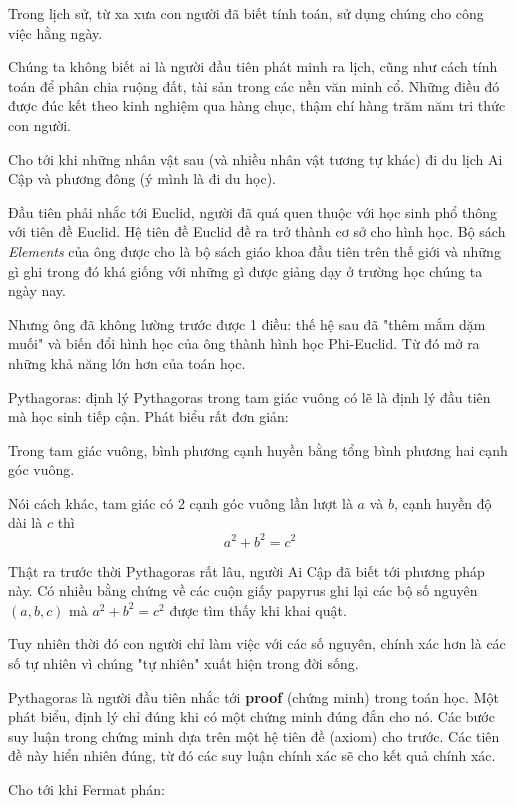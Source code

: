 Trong lịch sử, từ xa xưa con người đã biết tính toán, sử dụng chúng cho công việc hằng ngày.

Chúng ta không biết ai là người đầu tiên phát minh ra lịch, cũng như cách tính toán để phân chia ruộng đất, tài sản trong các nền văn minh cổ.
Những điều đó được đúc kết theo kinh nghiệm qua hàng chục, thậm chí hàng trăm năm tri thức con người.

Cho tới khi những nhân vật sau (và nhiều nhân vật tương tự khác) đi du lịch Ai Cập và phương đông (ý mình là đi du học).

Đầu tiên phải nhắc tới Euclid, người đã quá quen thuộc với học sinh phổ thông với tiên đề Euclid. Hệ tiên đề Euclid đề ra trở thành cơ sở cho hình học. Bộ sách \textit{Elements} của ông được cho là bộ sách giáo khoa đầu tiên trên thế giới và những gì ghi trong đó khá giống với những gì được giảng dạy ở trường học chúng ta ngày nay.

Nhưng ông đã không lường trước được 1 điều: thế hệ sau đã "thêm mắm dặm muối" và biến đổi hình học của ông thành hình học Phi-Euclid. Từ đó mở ra những khả năng lớn hơn của toán học.

Pythagoras: định lý Pythagoras trong tam giác vuông có lẽ là định lý đầu tiên mà học sinh tiếp cận. Phát biểu rất đơn giản:

\begin{theorem}
    Trong tam giác vuông, bình phương cạnh huyền bằng tổng bình phương hai cạnh góc vuông.

    Nói cách khác, tam giác có 2 cạnh góc vuông lần lượt là $a$ và $b$, cạnh huyền độ dài là $c$ thì
    \[a^2 + b^2 = c^2\]
\end{theorem}

Thật ra trước thời Pythagoras rất lâu, người Ai Cập đã biết tới phương pháp này. Có nhiều bằng chứng về các cuộn giấy papyrus ghi lại các bộ số nguyên $(a, b, c)$ mà $a^2 + b^2 = c^2$ được tìm thấy khi khai quật.

Tuy nhiên thời đó con người chỉ làm việc với các số nguyên, chính xác hơn là các số tự nhiên vì chúng "tự nhiên" xuất hiện trong đời sống.

Pythagoras là người đầu tiên nhắc tới \textbf{proof} (chứng minh) trong toán học. Một phát biểu, định lý chỉ đúng khi có một chứng minh đúng đắn cho nó. Các bước suy luận trong chứng minh dựa trên một hệ tiên đề (axiom) cho trước.
Các tiên đề này hiển nhiên đúng, từ đó các suy luận chính xác sẽ cho kết quả chính xác.

Cho tới khi Fermat phán:

